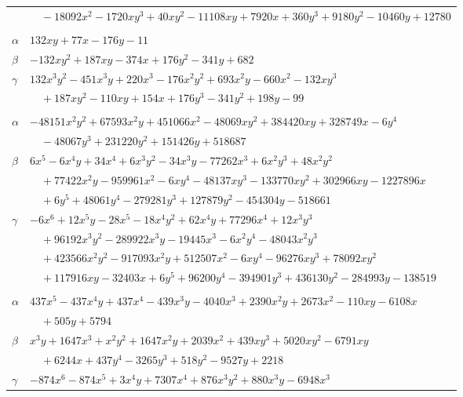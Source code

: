 \documentclass[11pt]{article}
\begin{document}
\begin{longtable}{@{}ll@{}}
 & $\quad -18092x^{2}-1720xy^{3}+40xy^{2}-11108xy+7920x+360y^{3}+9180y^{2}-10460y+12780$\\
\addlinespace[3pt]
\multicolumn{2}{@{}l}{$\{i,j\}=\{23,24\}$, $k_{ij}=2\cdot 5^{2}\cdot 11$}\\
$\alpha$ & $132xy+77x-176y-11$\\
$\beta$ & $-132xy^{2}+187xy-374x+176y^{2}-341y+682$\\
$\gamma$ & $132x^{3}y^{2}-451x^{3}y+220x^{3}-176x^{2}y^{2}+693x^{2}y-660x^{2}-132xy^{3}$\\
 & $\quad +187xy^{2}-110xy+154x+176y^{3}-341y^{2}+198y-99$\\
\addlinespace[3pt]
\multicolumn{2}{@{}l}{$\{i,j\}=\{23,90\}$, $k_{ij}=2^{3}\cdot 3\cdot 5^{2}\cdot 7\cdot 13\cdot 19$}\\
$\alpha$ & $-48151x^{2}y^{2}+67593x^{2}y+451066x^{2}-48069xy^{2}+384420xy+328749x-6y^{4}$\\
 & $\quad -48067y^{3}+231220y^{2}+151426y+518687$\\
$\beta$ & $6x^{5}-6x^{4}y+34x^{4}+6x^{3}y^{2}-34x^{3}y-77262x^{3}+6x^{2}y^{3}+48x^{2}y^{2}$\\
 & $\quad +77422x^{2}y-959961x^{2}-6xy^{4}-48137xy^{3}-133770xy^{2}+302966xy-1227896x$\\
 & $\quad +6y^{5}+48061y^{4}-279281y^{3}+127879y^{2}-454304y-518661$\\
$\gamma$ & $-6x^{6}+12x^{5}y-28x^{5}-18x^{4}y^{2}+62x^{4}y+77296x^{4}+12x^{3}y^{3}$\\
 & $\quad +96192x^{3}y^{2}-289922x^{3}y-19445x^{3}-6x^{2}y^{4}-48043x^{2}y^{3}$\\
 & $\quad +423566x^{2}y^{2}-917093x^{2}y+512507x^{2}-6xy^{4}-96276xy^{3}+78092xy^{2}$\\
 & $\quad +117916xy-32403x+6y^{5}+96200y^{4}-394901y^{3}+436130y^{2}-284993y-138519$\\
\addlinespace[3pt]
\multicolumn{2}{@{}l}{$\{i,j\}=\{23,98\}$, $k_{ij}=2^{4}\cdot 5^{2}\cdot 7^{2}$}\\
$\alpha$ & $437x^{5}-437x^{4}y+437x^{4}-439x^{3}y-4040x^{3}+2390x^{2}y+2673x^{2}-110xy-6108x$\\
 & $\quad +505y+5794$\\
$\beta$ & $x^{3}y+1647x^{3}+x^{2}y^{2}+1647x^{2}y+2039x^{2}+439xy^{3}+5020xy^{2}-6791xy$\\
 & $\quad +6244x+437y^{4}-3265y^{3}+518y^{2}-9527y+2218$\\
$\gamma$ & $-874x^{6}-874x^{5}+3x^{4}y+7307x^{4}+876x^{3}y^{2}+880x^{3}y-6948x^{3}$\\

\end{longtable}
\end{document}

